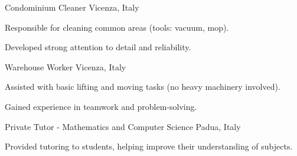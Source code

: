 

\begin{cventries}

  \cventry
    {Condominium Cleaner} %
    {} %
    {Vicenza, Italy} %
    {} %
    {
    \begin{cvitems}
    		\item Responsible for cleaning common areas (tools: vacuum, mop).
    		\item Developed strong attention to detail and reliability.
    \end{cvitems}
    }
\hfill \break
  \cventry
    {Warehouse Worker} %
    {} %
	{Vicenza, Italy} %
    {} %
    {
      \begin{cvitems} %
        \item {Assisted with basic lifting and moving tasks (no heavy machinery involved)}.
        \item {Gained experience in teamwork and problem-solving}.
      \end{cvitems}
    }
\hfill \break
  \cventry
    {Private Tutor - Mathematics and Computer Science} %
    {} %
	{Padua, Italy} %
    {} %
    {
      \begin{cvitems} %
        \item {Provided tutoring to students, helping improve their understanding of subjects}.
      \end{cvitems}
    }

\end{cventries}
